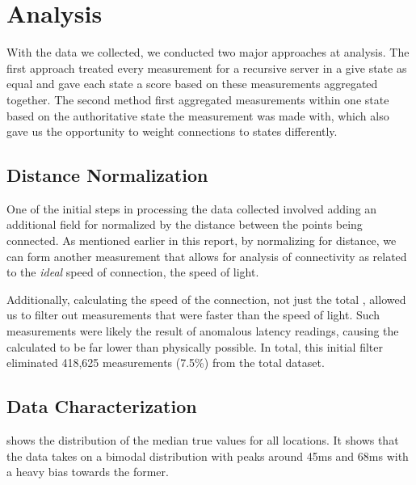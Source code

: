 \section{Analysis}\label{sec:dns_analysis} %

With the data we collected, we conducted two major approaches at analysis. The first approach treated every measurement for a recursive server in a give state as equal and gave each state a score based on these measurements aggregated together. The second method first aggregated measurements within one state based on the authoritative state the measurement was made with, which also gave us the opportunity to weight connections to states differently.

\subsection{Distance Normalization}
One of the initial steps in processing the data collected involved adding an additional field for \rtt normalized by the distance between the points being connected. As mentioned earlier in this report, by normalizing for distance, we can form another measurement that allows for analysis of connectivity as related to the \textit{ideal} speed of connection, the speed of light.

Additionally, calculating the speed of the connection, not just the total \rtt, allowed us to filter out measurements that were faster than the speed of light. Such measurements were likely the result of anomalous latency readings, causing the calculated \rtt to be far lower than physically possible. In total, this initial filter eliminated 418,625 measurements (7.5\%) from the total dataset.

\subsection{Data Characterization}

 shows the distribution of the median true \rtt values for all locations. It shows that the data takes on a bimodal distribution with peaks around 45ms and 68ms with a heavy bias towards the former.

